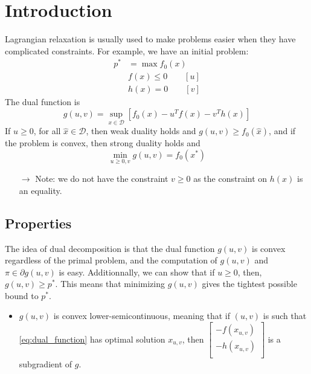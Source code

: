 \documentclass[12pt, openany]{report}
\theoremstyle{definition}
\begin{document}
\section{Introduction}
Lagrangian relaxation is usually used to make problems easier when they have complicated constraints. For example, we have an initial problem:
\begin{equation}
	\begin{aligned}
		p^* &= \max f_0(x)\\
		& f(x)\le 0 \qquad [u]\\
		& h(x) = 0 \qquad [v]
	\end{aligned}
\end{equation}
The dual function is 
\begin{equation}\label{eq:dual_function}
	g(u,v) = \sup_{x\in \mathcal{D}} [f_0(x)-u^Tf(x)-v^Th(x)]
\end{equation}
If $u\ge0$, for all $\hat x\in \mathcal{D}$, then weak duality holds and $g(u,v)\ge f_0(\hat x)$, and if the problem is convex, then strong duality holds and 
\begin{equation}
	\min_{u\ge0,v} g(u,v)=f_0(x^*)
\end{equation}
\begin{itemize}
	\item [$\to$] Note: we do not have the constraint $v\ge0$ as the constraint on $h(x)$ is an equality.
\end{itemize}
\subsection{Properties}
The idea of dual decomposition is that the dual function $g(u,v)$ is convex regardless of the primal problem, and the computation of $g(u,v)$ and $\pi\in \partial g(u,v)$ is easy. Additionnally, we can show that if $u\ge0$, then, $g(u,v)\ge p^*$. This means that minimizing $g(u,v)$ gives the tightest possible bound to $p^*$.\\
\begin{itemize}
	\item $g(u,v)$ is convex lower-semicontinuous, meaning that if $(u,v)$ is such that \eqref{eq:dual_function} has optimal solution $x_{u,v}$, then $\begin{bmatrix}
		-f(x_{u,v})\\ -h(x_{u,v})\\
	\end{bmatrix}$ is a subgradient of $g$.
\end{itemize}
\end{document}
